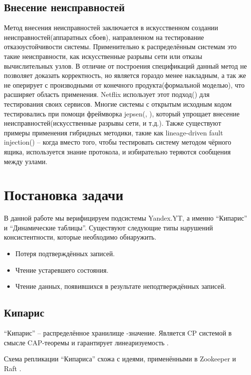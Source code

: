 \documentclass[pdftex,ptm,14pt,a4paper]{extreport}
\theoremstyle{definition}
\begin{document}
\section{Внесение неисправностей}
Метод внесения неисправностей заключается в искусственном создании неисправностей(аппаратных сбоев), направленном на
тестирование отказоустойчивости системы. Применительно к распределённым системам это такие неисправности, как искусственные разрывы сети или
отказы вычислительных узлов. В отличие от построения спецификаций данный метод не позволяет доказать корректность, но является гораздо менее накладным, а так же не оперирует с производными от конечного продукта(формальной моделью), что расширяет область применения.
Netflix использует этот подход(\cite{netflix-simian-army}) для тестирования своих сервисов.
Многие системы с открытым исходным кодом тестировались при помощи фреймворка jepsen(\cite{jepsen-io}, \cite{jepsen-analyses}), который
упрощает внесение неисправностей(искусственные разрывы сети, и т.д.).
Также существуют примеры применения
гибридных методики, такие как lineage-driven fault injection(\cite{molly}) -- когда вместо того, чтобы тестировать
систему методом чёрного ящика, используется знание протокола, и избирательно теряются сообщения между узлами.
\chapter{Постановка задачи}
В данной работе мы верифицируем подсистемы Yandex.YT, а именно “Кипарис” и “Динамические таблицы”.
Существуют следующие типы нарушений консистентности, которые необходимо обнаружить.
\begin{itemize}
    \item Потеря подтверждённых записей.
    \item Чтение устаревшего состояния.
    \item Чтение данных, появившихся в результате неподтверждённых записей.
\end{itemize}

\section{Кипарис}
“Кипарис” -- распределённое хранилище -значение\guillemotright.
Является CP системой в смысле CAP-теоремы и гарантирует линеаризуемость \cite{linearizable}.

Схема репликации “Кипариса” схожа с идеями, применёнными в Zookeeper \cite{zookeeper} и Raft \cite{raft}.
\end{document}
